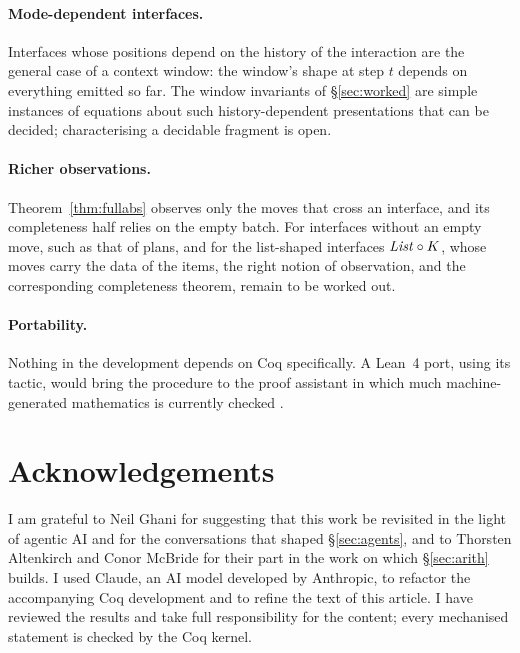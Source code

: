 \documentclass{fundam}
\begin{document}
\paragraph{Mode-dependent interfaces.}  Interfaces whose positions depend on the
history of the interaction \cite{Spivak26} are the general case of a context window: the
window's shape at step $t$ depends on everything emitted so far.  The window invariants of
\S\ref{sec:worked} are simple instances of equations about such history-dependent
presentations that can be decided; characterising a decidable fragment is open.

\paragraph{Richer observations.}  Theorem~\ref{thm:fullabs} observes only the moves that
cross an interface, and its completeness half relies on the empty batch.  For interfaces
without an empty move, such as that of plans, and for the list-shaped interfaces
$\mathit{List} \circ K$, whose moves carry the data of the items, the right notion of
observation, and the corresponding completeness theorem, remain to be worked out.

\paragraph{Portability.}  Nothing in the development depends on Coq specifically.  A Lean~4
port, using its  tactic, would bring the procedure to the proof assistant in
which much machine-generated mathematics is currently checked
\cite{Harmonic25,AlphaProof25}.

\section*{Acknowledgements}

I am grateful to Neil Ghani for suggesting that this work be revisited in the light of
agentic AI and for the conversations that shaped \S\ref{sec:agents}, and to Thorsten
Altenkirch and Conor McBride for their part in the work on which \S\ref{sec:arith} builds.
I used Claude, an AI model developed by Anthropic, to refactor the accompanying Coq
development and to refine the text of this article.  I have reviewed the results and take
full responsibility for the content; every mechanised statement is checked by the Coq
kernel.



\end{document}
